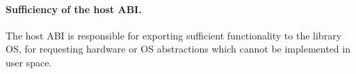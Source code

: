 \begin{comment}
The simplicity of the host ABIs requires retaining a minimalist design of host functions. %
The host ABIs should only contain operations that
are absolutely necessary for requesting external hardware abstractions.
Any functions that can be partially or wholly implemented inside the library OS
should be further simplified, or even removed from the host ABIs.
Moreover, the host ABIs have to be simple enough to implement on
most hosts;
that is, the host ABIs should contain only OS functions that are commonly offered on
most hosts.
The host ABIs are close to simplified UNIX interfaces,
such as reading or writing a file or an I/O device as a byte stream,
or creating a virtual memory mapping.
For most hosts,
implementing the host ABI should be as straightforward as redirecting the functions to the closest host system calls.
For example, the functionality of \syscall{StreamRead} and \syscall{StreamWrite} in the host ABIs can loosely match with
\syscall{read} and \syscall{write} in Linux,
or \syscall{ReadFile} and \syscall{WriteFile} in Windows.
Since most OSes have inherited a similar design from UNIX,
it is fair to assume finding
comparable OS functions %
to the host ABI would be reasonably easy.
\end{comment}



\paragraph{Sufficiency of the host ABI.}
The host ABI is responsible for exporting sufficient functionality to the library OS,
for requesting hardware or OS abstractions which cannot be implemented in user space.



